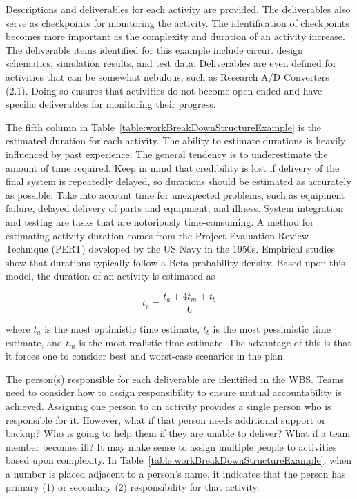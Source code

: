 Descriptions and deliverables for each activity are provided. The
deliverables also serve as checkpoints for monitoring the activity. The
identification of checkpoints becomes more important as the complexity
and duration of an activity increase. The deliverable items identified
for this example include circuit design schematics, simulation results,
and test data. Deliverables are even defined for activities that can be
somewhat nebulous, such as Research A/D Converters (2.1). Doing so
ensures that activities do not become open-ended and have specific
deliverables for monitoring their progress.

The fifth column in Table~\ref{table:workBreakDownStructureExample} 
is the estimated duration for each
activity. The ability to estimate durations is heavily influenced by
past experience. The general tendency is to underestimate the amount of
time required. Keep in mind that credibility is lost if delivery of the
final system is repeatedly delayed, so durations should be estimated as
accurately as possible. Take into account time for unexpected problems,
such as equipment failure, delayed delivery of parts and equipment, and
illness. System integration and testing are tasks that are notoriously
time-consuming. A method for estimating activity duration comes from the
Project Evaluation Review Technique (PERT) developed by the US Navy in
the 1950s. Empirical studies show that durations typically follow a Beta
probability density. Based upon this model, the duration of an activity
is estimated as

\begin{equation}
\label{equ:projectTimeEstimate}
t_e = \frac{t_a + 4t_m + t_b}{6}
\end{equation}

where $t_a$ is the most optimistic time
estimate, $t_b$ is the most pessimistic
time estimate, and $t_m$ is the most
realistic time estimate. The advantage of this is that it forces one to
consider best and worst-case scenarios in the plan.

The person(s) responsible for each deliverable are identified in the
WBS. Teams need to consider how to assign responsibility to ensure
mutual accountability is achieved. Assigning one person to an activity
provides a single person who is responsible for it. However, what if
that person needs additional support or backup? Who is going to help
them if they are unable to deliver? What if a team member becomes ill?
It may make sense to assign multiple people to activities based upon
complexity. In Table~\ref{table:workBreakDownStructureExample}, 
when a number is placed adjacent to a
person's name, it indicates that the person has primary (1) or secondary
(2) responsibility for that activity.

